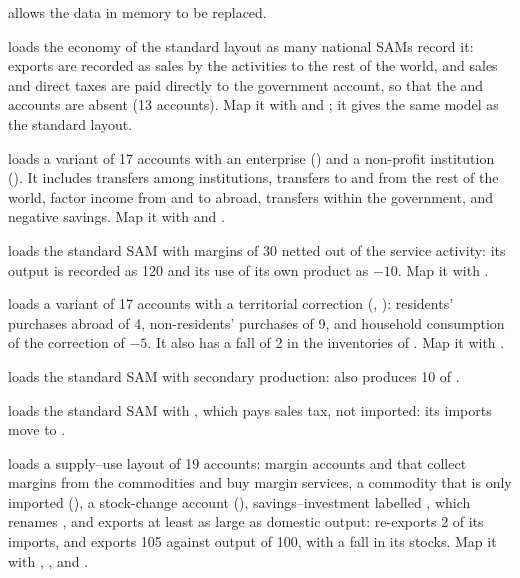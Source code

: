 \begin{optdesc}
\item[\opt{}{clear}] allows the data in memory to be replaced.

\item[\opt{nat}{ional}] loads the economy of the standard layout as many
national SAMs record it: exports are recorded as sales by the activities to the
rest of the world, and sales and direct taxes are paid directly to the
government account, so that the  and  accounts are
absent (13 accounts). Map it with  and ; it
gives the same model as the standard layout.

\item[\opt{ins}{titutions}] loads a variant of 17 accounts with an enterprise
() and a non-profit institution (). It includes transfers
among institutions, transfers to and from the rest of the world, factor income
from and to abroad, transfers within the government, and negative savings. Map
it with  and .

\item[\opt{mar}{gins}] loads the standard SAM with margins of 30 netted out of
the service activity: its output is recorded as 120 and its use of its own
product as $-10$. Map it with .

\item[\opt{ter}{ritorial}] loads a variant of 17 accounts with a territorial
correction (, ): residents' purchases abroad of 4,
non-residents' purchases of 9, and household consumption of the correction of
$-5$. It also has a fall of 2 in the inventories of . Map it with
.

\item[\opt{mult}{iproduct}] loads the standard SAM with secondary production:
 also produces 10 of .

\item[\opt{non}{imported}] loads the standard SAM with , which
pays sales tax, not imported: its imports move to .

\item[\opt{}{sut}] loads a supply--use layout of 19 accounts: margin accounts
 and  that collect margins from the commodities and buy
margin services, a commodity that is only imported (), a
stock-change account (), savings--investment labelled ,
which  renames , and exports at least as large as
domestic output:  re-exports 2 of its imports, and 
exports 105 against output of 100, with a fall in its stocks. Map it with
, ,
 and .


\end{optdesc}
